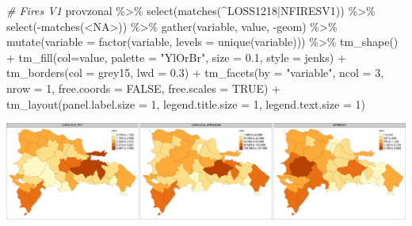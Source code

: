 \documentclass[10pt,landscape,a3paper]{article}
\newenvironment{Shaded}{\begin{snugshade}}{\end{snugshade}}
\newcommand{\AttributeTok}[1]{\textcolor[rgb]{0.77,0.63,0.00}{#1}}
\newcommand{\CommentTok}[1]{\textcolor[rgb]{0.56,0.35,0.01}{\textit{#1}}}
\newcommand{\ConstantTok}[1]{\textcolor[rgb]{0.00,0.00,0.00}{#1}}
\newcommand{\DecValTok}[1]{\textcolor[rgb]{0.00,0.00,0.81}{#1}}
\newcommand{\FloatTok}[1]{\textcolor[rgb]{0.00,0.00,0.81}{#1}}
\newcommand{\FunctionTok}[1]{\textcolor[rgb]{0.00,0.00,0.00}{#1}}
\newcommand{\NormalTok}[1]{#1}
\newcommand{\SpecialCharTok}[1]{\textcolor[rgb]{0.00,0.00,0.00}{#1}}
\newcommand{\StringTok}[1]{\textcolor[rgb]{0.31,0.60,0.02}{#1}}
\begin{document}
\begin{Shaded}
\begin{Highlighting}[]
\CommentTok{\# Fires V1}
\NormalTok{provzonal }\SpecialCharTok{\%\textgreater{}\%} \FunctionTok{select}\NormalTok{(}\FunctionTok{matches}\NormalTok{(}\StringTok{\textquotesingle{}\^{}LOSS1218|NFIRESV1\textquotesingle{}}\NormalTok{)) }\SpecialCharTok{\%\textgreater{}\%} \FunctionTok{select}\NormalTok{(}\SpecialCharTok{{-}}\FunctionTok{matches}\NormalTok{(}\StringTok{\textquotesingle{}\textless{}NA\textgreater{}\textquotesingle{}}\NormalTok{)) }\SpecialCharTok{\%\textgreater{}\%} 
  \FunctionTok{gather}\NormalTok{(variable, value, }\SpecialCharTok{{-}}\NormalTok{geom) }\SpecialCharTok{\%\textgreater{}\%}
  \FunctionTok{mutate}\NormalTok{(}\AttributeTok{variable =} \FunctionTok{factor}\NormalTok{(variable, }\AttributeTok{levels =} \FunctionTok{unique}\NormalTok{(variable))) }\SpecialCharTok{\%\textgreater{}\%} 
  \FunctionTok{tm\_shape}\NormalTok{() }\SpecialCharTok{+}
  \FunctionTok{tm\_fill}\NormalTok{(}\AttributeTok{col=}\StringTok{\textquotesingle{}value\textquotesingle{}}\NormalTok{, }\AttributeTok{palette =} \StringTok{"YlOrBr"}\NormalTok{, }\AttributeTok{size =} \FloatTok{0.1}\NormalTok{, }\AttributeTok{style =} \StringTok{\textquotesingle{}jenks\textquotesingle{}}\NormalTok{) }\SpecialCharTok{+}
  \FunctionTok{tm\_borders}\NormalTok{(}\AttributeTok{col =} \StringTok{\textquotesingle{}grey15\textquotesingle{}}\NormalTok{, }\AttributeTok{lwd =} \FloatTok{0.3}\NormalTok{) }\SpecialCharTok{+}
  \FunctionTok{tm\_facets}\NormalTok{(}\AttributeTok{by =} \StringTok{"variable"}\NormalTok{, }\AttributeTok{ncol =} \DecValTok{3}\NormalTok{, }\AttributeTok{nrow =} \DecValTok{1}\NormalTok{, }\AttributeTok{free.coords =} \ConstantTok{FALSE}\NormalTok{, }\AttributeTok{free.scales =} \ConstantTok{TRUE}\NormalTok{) }\SpecialCharTok{+}
  \FunctionTok{tm\_layout}\NormalTok{(}\AttributeTok{panel.label.size =} \DecValTok{1}\NormalTok{, }\AttributeTok{legend.title.size =} \DecValTok{1}\NormalTok{, }\AttributeTok{legend.text.size =} \DecValTok{1}\NormalTok{)}
\end{Highlighting}
\end{Shaded}

\begin{center}\includegraphics{img/data-download-preparation-eda/zonal-prov-8} \end{center}
\end{document}
